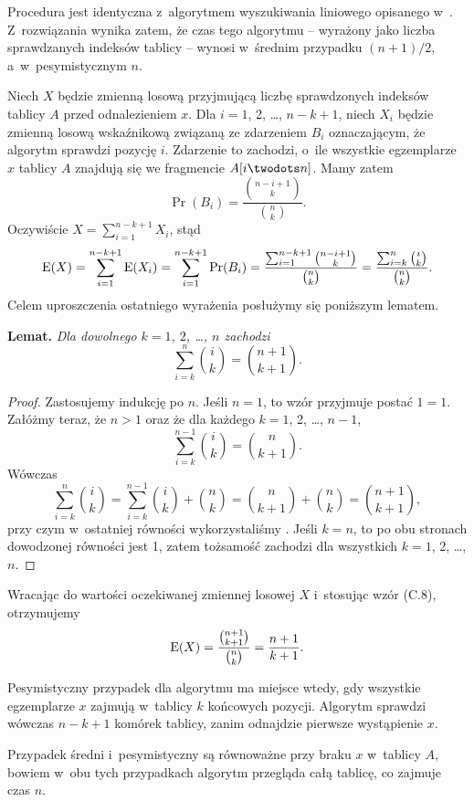 \subproblem %
Procedura  jest identyczna z~algorytmem wyszukiwania liniowego opisanego w~.
Z~rozwiązania  wynika zatem, że czas tego algorytmu -- wyrażony jako liczba sprawdzanych indeksów tablicy -- wynosi w~średnim przypadku $(n+1)/2$, a~w~pesymistycznym $n$.

\subproblem %
Niech $X$ będzie zmienną losową przyjmującą liczbę sprawdzonych indeksów tablicy $A$ przed odnalezieniem $x$.
Dla $i=1$, 2, \dots, $n-k+1$, niech $X_i$ będzie zmienną losową wskaźnikową związaną ze zdarzeniem $B_i$ oznaczającym, że algorytm  sprawdzi pozycję $i$.
Zdarzenie to zachodzi, o~ile wszystkie egzemplarze $x$ tablicy $A$ znajdują się we fragmencie $A[i\twodots n]$.
Mamy zatem
\[
	\Pr(B_i) = \frac{\binom{n-i+1}{k}}{\binom{n}{k}}.
\]
Oczywiście $X=\sum_{i=1}^{n-k+1}X_i$, stąd
\[
	\operatorname{E}(X) = \sum_{i=1}^{n-k+1}\operatorname{E}(X_i) = \sum_{i=1}^{n-k+1}\Pr(B_i) = \frac{\sum_{i=1}^{n-k+1}\binom{n-i+1}{k}}{\binom{n}{k}} = \frac{\sum_{i=k}^n\binom{i}{k}}{\binom{n}{k}}.
\]
Celem uproszczenia ostatniego wyrażenia posłużymy się poniższym lematem.

\medskip
\noindent\textsf{\textbf{Lemat.}} \textit{Dla dowolnego\/ $k=1$, $2$, \dots, $n$ zachodzi}
	\[
		\sum_{i=k}^n\binom{i}{k} = \binom{n+1}{k+1}.
	\]
\begin{proof}
	Zastosujemy indukcję po $n$.
	Jeśli $n=1$, to wzór przyjmuje postać $1=1$.
	Załóżmy teraz, że $n>1$ oraz że dla każdego $k=1$, 2, \dots, $n-1$,
	\[
		\sum_{i=k}^{n-1}\binom{i}{k} = \binom{n}{k+1}.
	\]
	Wówczas
	\[
		\sum_{i=k}^n\binom{i}{k} = \sum_{i=k}^{n-1}\binom{i}{k}+\binom{n}{k} = \binom{n}{k+1}+\binom{n}{k} = \binom{n+1}{k+1},
	\]
	przy czym w~ostatniej równości wykorzystaliśmy .
	Jeśli $k=n$, to po obu stronach dowodzonej równości jest 1, zatem tożsamość zachodzi dla wszystkich $k=1$, 2, \dots, $n$.
\end{proof}

Wracając do wartości oczekiwanej zmiennej losowej $X$ i~stosując wzór (C.8), otrzymujemy
\[
	\operatorname{E}(X) = \frac{\binom{n+1}{k+1}}{\binom{n}{k}} = \frac{n+1}{k+1}.
\]

Pesymistyczny przypadek dla algorytmu  ma miejsce wtedy, gdy wszystkie egzemplarze $x$ zajmują w~tablicy $k$ końcowych pozycji.
Algorytm sprawdzi wówczas $n-k+1$ komórek tablicy, zanim odnajdzie pierwsze wystąpienie $x$.

\subproblem %
Przypadek średni i~pesymistyczny są równoważne przy braku $x$ w~tablicy $A$, bowiem w~obu tych przypadkach algorytm przegląda całą tablicę, co zajmuje czas $n$.

